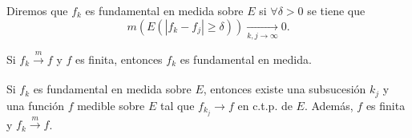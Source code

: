 \begin{definicion}{}
Diremos que $f_k$ es fundamental en medida sobre $E$ si $\forall \delta>0$ se tiene que 
\[
m\left(E\left(\left|f_k-f_j\right|\geq \delta\right)\right)\xrightarrow[k,j \to \infty]{} 0.
\]
\end{definicion}

\begin{observacion}{}
Si $f_k \xrightarrow[]{m}f$ y $f$ es finita, entonces $f_k$ es fundamental en medida. 
\end{observacion}



\begin{teorema}{}
Si $f_k$ es fundamental en medida sobre $E$, entonces existe una subsucesi\'on $k_j$ y una funci\'on $f$ medible sobre $E$ tal que $f_{k_j}\to f$ en c.t.p. de $E$. Adem\'as, $f$ es finita y $f_{k} \xrightarrow[]{m}f$.
\end{teorema}

